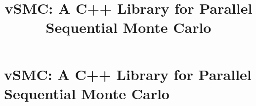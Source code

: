 \ifx\inthesis\undefined %

\title{vSMC: A C++ Library for Parallel Sequential Monte Carlo}

\maketitle
\else %
\chapter{vSMC: A C++ Library for Parallel Sequential Monte Carlo}
\label{cha:vSMC: A C++ Library for Parallel Sequential Monte Carlo}
\fi %


\ifx\inthesis\undefined
\printbibliography
\else\relax\fi
